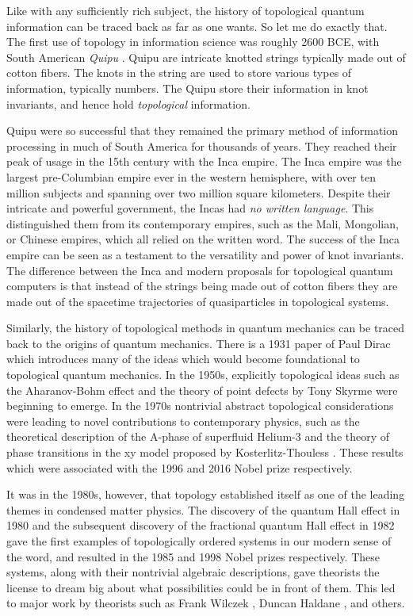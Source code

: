 \documentclass{article}
\theoremstyle{definition}
\numberwithin{figure}{section}
\begin{document}
Like with any sufficiently rich subject, the history of topological quantum information can be traced back as far as one wants. So let me do exactly that. The first use of topology in information science was roughly 2600 BCE, with South American \textit{Quipu} \cite{ascher1981code}. Quipu are intricate knotted strings typically made out of cotton fibers. The knots in the string are used to store various types of information, typically numbers. The Quipu store their information in knot invariants, and hence hold \textit{topological} information.

Quipu were so successful that they remained the primary method of information processing in much of South America for thousands of years. They reached their peak of usage in the 15th century with the Inca empire. The Inca empire was the largest pre-Columbian empire ever in the western hemisphere, with over ten million subjects and spanning over two million square kilometers. Despite their intricate and powerful government, the Incas had \textit{no written language}. This distinguished them from its contemporary empires, such as the Mali, Mongolian, or Chinese empires, which all relied on the written word. The success of the Inca empire can be seen as a testament to the versatility and power of knot invariants. The difference between the Inca and modern proposals for topological quantum computers is that instead of the strings being made out of cotton fibers they are made out of the spacetime trajectories of quasiparticles in topological systems.

Similarly, the history of topological methods in quantum mechanics can be traced back to the origins of quantum mechanics. There is a 1931 paper of Paul Dirac \cite{dirac1931quantised} which introduces many of the ideas which would become foundational to topological quantum mechanics. In the 1950s, explicitly topological ideas such as the Aharanov-Bohm effect \cite{aharonov1959significance} and the theory of point defects by Tony Skyrme \cite{skyrme1962unified} were beginning to emerge. In the 1970s nontrivial abstract topological considerations were leading to novel contributions to contemporary physics, such as the theoretical description of the A-phase of superfluid Helium-3 \cite{anderson1977phase} and the theory of phase transitions in the xy model proposed by Kosterlitz-Thouless \cite{kosterlitz1973ordering}. These results which were associated with the 1996 and 2016 Nobel prize respectively.

It was in the 1980s, however, that topology established itself as one of the leading themes in condensed matter physics. The discovery of the quantum Hall effect in 1980 \cite{klitzing1980new} and the subsequent discovery of the fractional quantum Hall effect in 1982 \cite{tsui1982two} gave the first examples of topologically ordered systems in our modern sense of the word, and resulted in the 1985 and 1998 Nobel prizes respectively. These systems, along with their nontrivial algebraic descriptions, gave theorists the license to dream big about what possibilities could be in front of them. This led to major work by theorists such as Frank Wilczek \cite{wilczek1982quantum, arovas1985statistical}, Duncan Haldane \cite{haldane1983nonlinear, haldane1988model}, and others.
\end{document}
